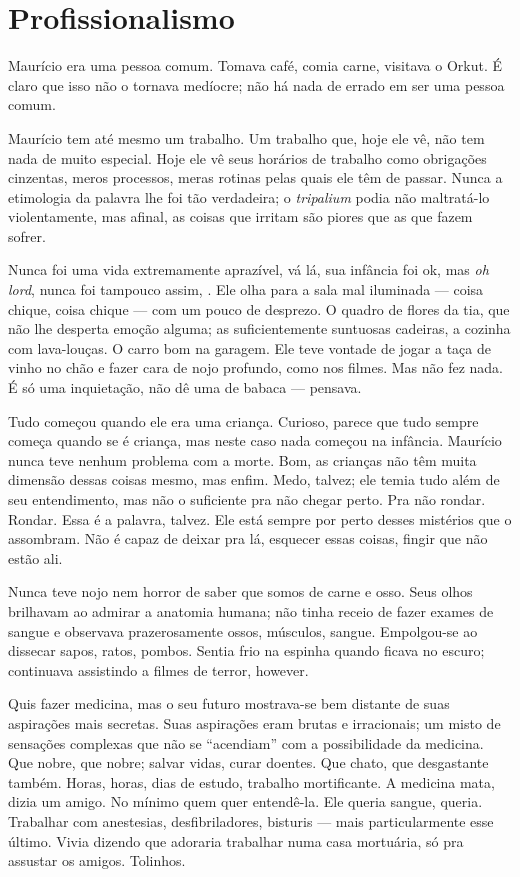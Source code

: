 \chapter{Profissionalismo}

Maurício era uma pessoa comum. Tomava café, comia carne, visitava o Orkut. É claro que isso não o tornava medíocre; não há nada de errado em ser uma pessoa comum.

Maurício tem até mesmo um trabalho. Um trabalho que, hoje ele vê, não tem nada de muito especial. Hoje ele vê seus horários de trabalho como obrigações cinzentas, meros processos, meras rotinas pelas quais ele têm de passar. Nunca a etimologia da palavra lhe foi tão verdadeira; o \emph{tripalium} podia não maltratá-lo violentamente, mas afinal, as coisas que irritam são piores que as que fazem sofrer.

Nunca foi uma vida extremamente aprazível, vá lá, sua infância foi ok, mas \emph{oh lord}, nunca foi tampouco assim, . Ele olha para a sala mal iluminada --- coisa chique, coisa chique --- com um pouco de desprezo. O quadro de flores da tia, que não lhe desperta emoção alguma; as suficientemente suntuosas cadeiras, a cozinha com lava-louças. O carro bom na garagem. Ele teve vontade de jogar a taça de vinho no chão e fazer cara de nojo profundo, como nos filmes. Mas não fez nada. É só uma inquietação, não dê uma de babaca --- pensava.

Tudo começou quando ele era uma criança. Curioso, pa\-re\-ce que tudo sempre começa quando se é criança, mas neste caso nada começou na infância. Maurício nunca teve nenhum problema com a morte. Bom, as crianças não têm muita dimensão dessas coisas mesmo, mas enfim. Medo, talvez; ele temia tudo além de seu entendimento, mas não o suficiente pra não chegar perto. Pra não rondar. Rondar. Essa é a palavra, talvez. Ele está sempre por perto desses mistérios que o assombram. Não é capaz de deixar pra lá, esquecer essas coisas, fingir que não estão ali.

Nunca teve nojo nem horror de saber que somos de carne e osso. Seus olhos brilhavam ao admirar a anatomia humana; não tinha receio de fazer exames de sangue e observava prazerosamente ossos, músculos, sangue. Empolgou-se ao dissecar sapos, ratos, pombos. Sentia frio na espinha quando ficava no escuro; continuava assistindo a filmes de terror, however.

Quis fazer medicina, mas o seu futuro mostrava-se bem distante de suas aspirações mais secretas. Suas aspirações eram brutas e irracionais; um misto de sensações complexas que não se ``acendiam'' com a possibilidade da medicina. Que nobre, que nobre; salvar vidas, curar doentes. Que chato, que desgastante também. Horas, horas, dias de estudo, trabalho mortificante. A medicina mata, dizia um amigo. No mínimo quem quer entendê-la. Ele queria sangue, queria. Trabalhar com anestesias, desfibriladores, bisturis --- mais particularmente esse último. Vivia dizendo que adoraria trabalhar numa casa mortuária, só pra assustar os amigos. Tolinhos.

